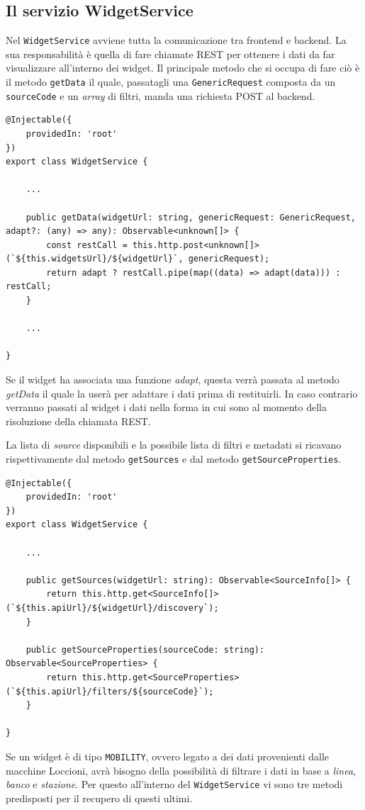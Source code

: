 \subsection{Il servizio WidgetService}
Nel \verb|WidgetService| avviene tutta la comunicazione tra frontend e backend.
La sua responsabilità è quella di fare chiamate REST per ottenere i dati da far visualizzare all'interno dei widget. Il principale metodo che si occupa di fare ciò è il metodo \verb|getData| il quale, passatagli una \verb|GenericRequest| composta da un \verb|sourceCode| e un \textit{array} di filtri, manda una richiesta POST al backend.

\begin{lstlisting}[caption={Metodo getData all'interno della classe WidgetService}, style=javaScriptCode]
@Injectable({
    providedIn: 'root'
})
export class WidgetService {

    ...

    public getData(widgetUrl: string, genericRequest: GenericRequest, adapt?: (any) => any): Observable<unknown[]> {
        const restCall = this.http.post<unknown[]>(`${this.widgetsUrl}/${widgetUrl}`, genericRequest);
        return adapt ? restCall.pipe(map((data) => adapt(data))) : restCall;
    }
    
    ...

}

\end{lstlisting}
Se il widget ha associata una funzione \textit{adapt}, questa verrà passata al metodo \textit{getData} il quale la userà per adattare i dati prima di restituirli. In caso contrario verranno passati al widget i dati nella forma in cui sono al momento della risoluzione della chiamata REST.

La lista di \textit{source} disponibili e la possibile lista di filtri e metadati si ricavano rispettivamente dal metodo \verb|getSources| e dal metodo \verb|getSourceProperties|.

\begin{lstlisting}[caption={Metodi getSources e getSourceProperties all'interno della classe WidgetService}, style=javaScriptCode]
@Injectable({
    providedIn: 'root'
})
export class WidgetService {

    ...
        
    public getSources(widgetUrl: string): Observable<SourceInfo[]> {
        return this.http.get<SourceInfo[]>(`${this.apiUrl}/${widgetUrl}/discovery`);
    }

    public getSourceProperties(sourceCode: string): Observable<SourceProperties> {
        return this.http.get<SourceProperties>(`${this.apiUrl}/filters/${sourceCode}`);
    }

}
\end{lstlisting}
Se un widget è di tipo \verb|MOBILITY|, ovvero legato a dei dati provenienti dalle macchine Loccioni, avrà bisogno della possibilità di filtrare i dati in base a \textit{linea}, \textit{banco} e \textit{stazione}. Per questo all'interno del \verb|WidgetService| vi sono tre metodi predisposti per il recupero di questi ultimi.

